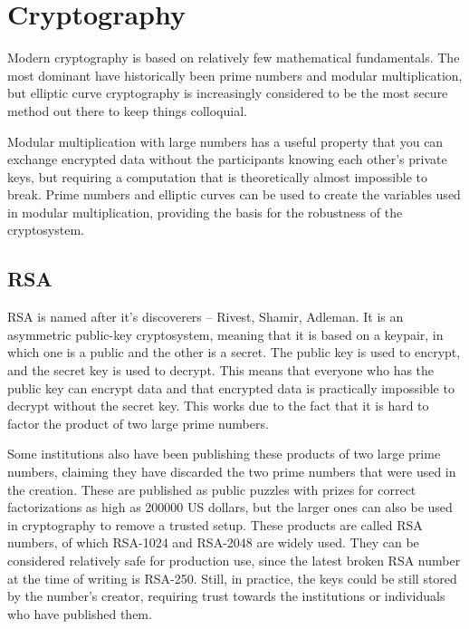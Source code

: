 \chapter{Cryptography}
\label{Cryptography}

Modern cryptography is based on relatively few mathematical fundamentals. The most dominant  have historically been prime numbers and modular multiplication, but elliptic curve cryptography is increasingly considered to be the most secure method out there to keep things colloquial.

Modular multiplication with large numbers has a useful property that you can exchange encrypted data without the participants knowing each other's private keys, but requiring a computation that is theoretically almost impossible to break. Prime numbers and elliptic curves can be used to create the variables used in modular multiplication, providing the basis for the robustness of the cryptosystem.

\section{RSA}

RSA is named after it's discoverers – Rivest, Shamir, Adleman. It is an asymmetric public-key cryptosystem, meaning that it is based on a keypair, in which one is a public and the other is a secret. The public key is used to encrypt, and the secret key is used to decrypt. This means that everyone who has the public key can encrypt data and that encrypted data is practically impossible to decrypt without the secret key. This works due to the fact that it is hard to factor the product of two large prime numbers.


Some institutions also have been publishing these products of two large prime numbers, claiming they have discarded the two prime numbers that were used in the creation. These are published as public puzzles with prizes for correct factorizations as high as 200000 US dollars, but the larger ones can also be used in cryptography to remove a trusted setup. These products are called RSA numbers, of which RSA-1024 and RSA-2048 are widely used. They can be considered relatively safe for production use, since the latest broken RSA number at the time of writing is RSA-250. Still, in practice, the keys could be still stored by the number's creator, requiring trust towards the institutions or individuals who have published them.

